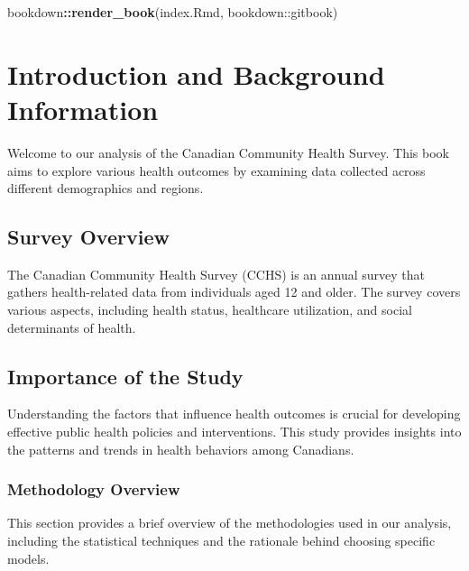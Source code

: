 \documentclass[
]{book}
\newenvironment{Shaded}{\begin{snugshade}}{\end{snugshade}}
\newcommand{\FunctionTok}[1]{\textcolor[rgb]{0.13,0.29,0.53}{\textbf{#1}}}
\newcommand{\NormalTok}[1]{#1}
\newcommand{\SpecialCharTok}[1]{\textcolor[rgb]{0.81,0.36,0.00}{\textbf{#1}}}
\newcommand{\StringTok}[1]{\textcolor[rgb]{0.31,0.60,0.02}{#1}}
\begin{document}
\begin{Shaded}
\begin{Highlighting}[]
\NormalTok{bookdown}\SpecialCharTok{::}\FunctionTok{render\_book}\NormalTok{(}\StringTok{\textquotesingle{}index.Rmd\textquotesingle{}}\NormalTok{, }\StringTok{\textquotesingle{}bookdown::gitbook\textquotesingle{}}\NormalTok{)}
\end{Highlighting}
\end{Shaded}

\chapter{Introduction and Background Information}\label{introduction-and-background-information}

Welcome to our analysis of the Canadian Community Health Survey. This book aims to explore various health outcomes by examining data collected across different demographics and regions.

\section{Survey Overview}\label{survey-overview}

The Canadian Community Health Survey (CCHS) is an annual survey that gathers health-related data from individuals aged 12 and older. The survey covers various aspects, including health status, healthcare utilization, and social determinants of health.

\section{Importance of the Study}\label{importance-of-the-study}

Understanding the factors that influence health outcomes is crucial for developing effective public health policies and interventions. This study provides insights into the patterns and trends in health behaviors among Canadians.

\subsection*{Methodology Overview}\label{methodology-overview}

This section provides a brief overview of the methodologies used in our analysis, including the statistical techniques and the rationale behind choosing specific models.
\end{document}
